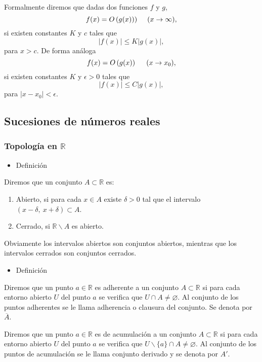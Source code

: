 \documentclass[12pt]{article}
\begin{document}
Formalmente diremos que dadas dos funciones $f$ y $g$, \[ f(x)=O\left(g(x)\right))\hspace{0.5cm}(x\to\infty), \]si existen constantes $K$ y $c$ tales que \[ |f(x)|\le K |g(x)|, \] para $x>c$. De forma análoga \[ f(x)=O\left(g(x)\right) \hspace{0.5cm}(x\to x_0),\] si existen constantes $K$ y $\epsilon>0$ tales que \[ |f(x)|\le C|g(x)|, \] para $|x-x_0|<\epsilon$.
\subsection{Sucesiones de números reales}
\subsubsection{Topología en $\mathbb{R}$}
\begin{itemize}[label=\color{red}\textbullet, leftmargin=*]
	\item \color{lightblue}Definición
\end{itemize}
Diremos que un conjunto $A\subset\mathbb{R}$ es:
\begin{enumerate}[label=\arabic*)]
	\item Abierto, si para cada $x\in A$ existe $\delta>0$ tal que el intervalo $(x-\delta,~x+\delta)\subset A$.
	\item Cerrado, si $\mathbb{R}\backslash A$ es abierto.
\end{enumerate}
Obviamente los intervalos abiertos son conjuntos abiertos, mientras que los intervalos cerrados son conjuntos cerrados.
\begin{itemize}[label=\color{red}\textbullet, leftmargin=*]
	\item \color{lightblue}Definición
\end{itemize}
Diremos que un punto $a\in\mathbb{R}$ es adherente a un conjunto $A\subset\mathbb{R}$ si para cada entorno abierto $U$ del punto $a$ se verifica que $U\cap A\neq\varnothing$.  Al conjunto de los puntos adherentes se le llama adherencia o clausura del conjunto. Se denota por $\overline{A}$.

Diremos que un punto $a\in\mathbb{R}$ es de acumulación a un conjunto $A\subset\mathbb{R}$ si para cada entorno abierto $U$ del punto $a$ se verifica que $U\backslash\{a\}\cap A\neq\varnothing$. Al conjunto de los puntos de acumulación se le llama conjunto derivado y se denota por $A'$.
\end{document}
